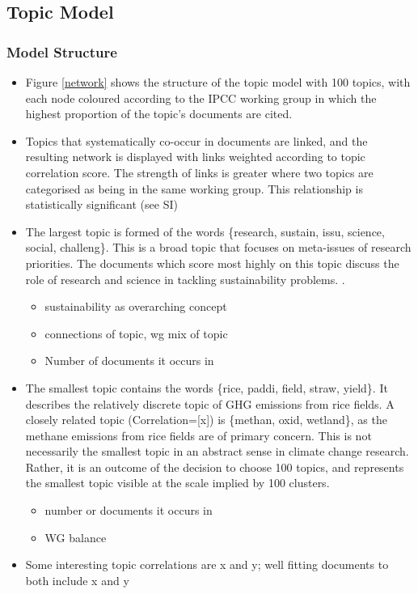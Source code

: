 \documentclass{article}
\begin{document}
\subsection*{Topic Model}

\subsubsection*{Model Structure}
\begin{itemize}

	\item Figure \ref{network} shows the structure of the topic model with 100 topics, with each node coloured according to the IPCC working group in which the highest proportion of the topic's documents are cited.
    
    \item Topics that systematically co-occur in documents are linked, and the resulting network is displayed with links weighted according to topic correlation score. The strength of links is greater where two topics are categorised as being in the same working group. This relationship is statistically significant (see SI)
    
    \item The largest topic is formed of the words \{research, sustain, issu, science, social, challeng\}. This is a broad topic that focuses on meta-issues of research priorities. The documents which score most highly on this topic discuss the role of research and science in tackling sustainability problems. \citep[e.g.][]{Miller2014}.
    
    \begin{itemize}
    	\item sustainability as overarching concept
    	\item connections of topic, wg mix of topic
    	\item Number of documents it occurs in
    \end{itemize}
    
	\item The smallest topic contains the words \{rice, paddi, field, straw, yield\}.  It describes the relatively discrete topic of GHG emissions from rice fields. A closely related topic (Correlation=[x]) is \{methan, oxid, wetland\}, as the methane emissions from rice fields are of primary concern. This is not necessarily the smallest topic in an abstract sense in climate change research. Rather, it is an outcome of the decision to choose 100 topics, and represents the smallest topic visible at the scale implied by 100 clusters.
    
	\begin{itemize}
		\item number or documents it occurs in
		\item WG balance
	\end{itemize}
    
    \item Some interesting topic correlations are x and y; well fitting documents to both include x and y
    
\end{itemize}
\end{document}
